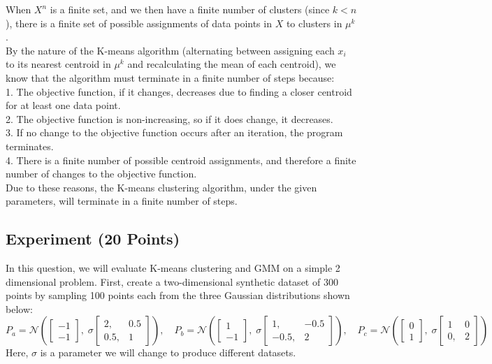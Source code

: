 \documentclass[a4paper]{article}
\newcounter{thm}
\newcommand{\Ncal}{\mathcal{N}}
\theoremstyle{definition}
\newenvironment{soln}{
	\leavevmode\color{blue}\ignorespaces
}{}
\begin{document}
\begin{enumerate}
\begin{soln}
	When $X^n$ is a finite set, and we then have a finite number of clusters (since $k < n$), there is a finite set of possible assignments of data points in $X$ to clusters in $\mu^k$. \\
	By the nature of the K-means algorithm (alternating between assigning each $x_i$ to its nearest centroid in $\mu^k$ and recalculating the mean of each centroid), we know that the algorithm must terminate in a finite number of steps because: \\
	1. The objective function, if it changes, decreases due to finding a closer centroid for at least one data point. \\
	2. The objective function is non-increasing, so if it does change, it decreases. \\
	3. If no change to the objective function occurs after an iteration, the program terminates. \\
	4. There is a finite number of possible centroid assignments, and therefore a finite number of changes to the objective function. \\
	
	Due to these reasons, the K-means clustering algorithm, under the given parameters, will terminate in a finite number of steps.
\end{soln}

\end{enumerate}



\subsection{Experiment (20 Points)}

In this question, we will evaluate
K-means clustering and GMM on a simple 2 dimensional problem.
First, create a two-dimensional synthetic dataset of 300 points by sampling 100 points each from the
three Gaussian distributions shown below:
\[
P_a = \Ncal\left(
\begin{bmatrix}
-1 \\ -1
\end{bmatrix},
\;
\sigma\begin{bmatrix}
2, &0.5 \\ 0.5, &1
\end{bmatrix}
\right),
\quad
P_b = \Ncal\left(
\begin{bmatrix}
1 \\ -1
\end{bmatrix},
\;
 \sigma\begin{bmatrix}
1, &-0.5 \\ -0.5, &2
\end{bmatrix}
\right),
\quad
P_c = \Ncal\left(
\begin{bmatrix}
0 \\ 1
\end{bmatrix},
\;
 \sigma\begin{bmatrix}
1 &0 \\ 0, &2
\end{bmatrix}
\right)
\]
Here, $\sigma$ is a parameter we will change to produce different datasets.\\
\end{document}
